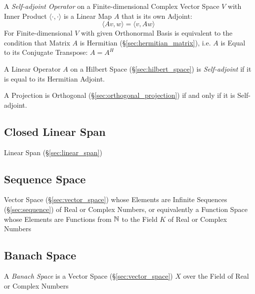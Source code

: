 A \emph{Self-adjoint Operator} on a Finite-dimensional Complex Vector Space $V$
with Inner Product $\langle{\cdot, \cdot}\rangle$ is a Linear Map $A$ that is
its own Adjoint:
\[
  \langle{Av,w}\rangle = \langle{v,Aw}\rangle
\]
For Finite-dimensional $V$ with given Orthonormal Basis is equivalent to the
condition that Matrix $A$ is Hermitian (\S\ref{sec:hermitian_matrix}), i.e. $A$
is Equal to its Conjugate Transpose: $A = A^H$

A Linear Operator $A$ on a Hilbert Space (\S\ref{sec:hilbert_space}) is
\emph{Self-adjoint} if it is equal to its Hermitian Adjoint.

A Projection is Orthogonal (\S\ref{sec:orthogonal_projection}) if and only if
it is Self-adjoint.



\subsection{Closed Linear Span}\label{sec:closed_linear_span}

Linear Span (\S\ref{sec:linear_span})



\subsection{Sequence Space}\label{sec:sequence_space}

Vector Space (\S\ref{sec:vector_space}) whose Elements are Infinite Sequences
(\S\ref{sec:sequence}) of Real or Complex Numbers, or equivalently a Function
Space whose Elements are Functions from $\mathbb{N}$ to the Field $K$ of Real or
Complex Numbers



\subsection{Banach Space}\label{sec:banach_space}

A \emph{Banach Space} is a Vector Space (\S\ref{sec:vector_space}) $X$ over the
Field of Real or Complex Numbers

